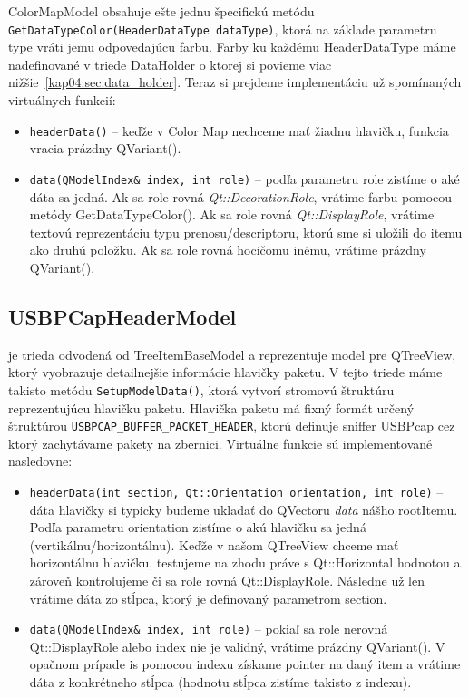 ColorMapModel obsahuje ešte jednu špecifickú metódu \newline\texttt{GetDataTypeColor(HeaderDataType dataType)}, ktorá na základe parametru type vráti jemu odpovedajúcu farbu. Farby ku každému HeaderDataType máme nadefinované v triede DataHolder o ktorej si povieme viac nižšie~\ref{kap04:sec:data_holder}. Teraz si prejdeme implementáciu už spomínaných virtuálnych funkcií:
\begin{itemize}
\item \texttt{headerData()} -- keďže v Color Map nechceme mať žiadnu hlavičku, funkcia vracia prázdny QVariant().
\item \texttt{data(QModelIndex\& index, int role)} -- podľa parametru role zistíme o aké dáta sa jedná. Ak sa role rovná \textit{Qt::DecorationRole}, vrátime farbu pomocou metódy GetDataTypeColor(). Ak sa role rovná \textit{Qt::DisplayRole}, vrátime textovú reprezentáciu typu prenosu/descriptoru, ktorú sme si uložili do itemu ako druhú položku. Ak sa role rovná hocičomu inému, vrátime prázdny QVariant().
\end{itemize}


\subsection{USBPCapHeaderModel}
je trieda odvodená od TreeItemBaseModel a reprezentuje model pre QTreeView, ktorý vyobrazuje detailnejšie informácie hlavičky paketu. V tejto triede máme takisto metódu \texttt{SetupModelData()}, ktorá vytvorí stromovú štruktúru reprezentujúcu hlavičku paketu. Hlavička paketu má fixný formát určený štruktúrou \texttt{USBPCAP\_BUFFER\_PACKET\_HEADER}, ktorú definuje sniffer USBPcap cez ktorý zachytávame pakety na zbernici.
Virtuálne funkcie sú implementované nasledovne:
\begin{itemize}
\label{kap04:sec:usbh_virt}
\item \texttt{headerData(int section, Qt::Orientation orientation, int \newline role)} -- dáta hlavičky si typicky budeme ukladať do QVectoru \textit{data} nášho rootItemu. Podľa parametru orientation zistíme o akú hlavičku sa jedná (vertikálnu/horizontálnu). Keďže v našom QTreeView chceme mať horizontálnu hlavičku, testujeme na zhodu práve s Qt::Horizontal hodnotou a zároveň kontrolujeme či sa role rovná Qt::DisplayRole. Následne už len vrátime dáta zo stĺpca, ktorý je definovaný parametrom section.
\item \texttt{data(QModelIndex\& index, int role)} -- pokiaľ sa role nerovná \newline Qt::DisplayRole alebo index nie je validný, vrátime prázdny QVariant(). V opačnom prípade is pomocou indexu získame pointer na daný item a vrátime dáta z konkrétneho stĺpca (hodnotu stĺpca zistíme takisto z indexu).
\end{itemize}

